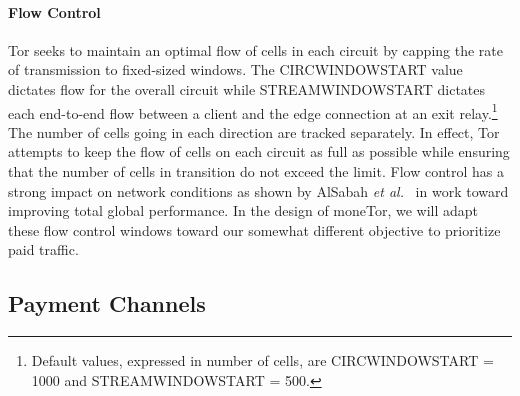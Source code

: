 \paragraph*{Flow Control} Tor seeks to maintain an optimal flow of cells in
each circuit by capping the rate of transmission to fixed-sized windows. The
CIRCWINDOWSTART value dictates flow for the overall circuit while
STREAMWINDOWSTART dictates each end-to-end flow between a client and the edge
connection at an exit relay.\footnote{Default values, expressed in number of
  cells, are CIRCWINDOWSTART = 1000 and STREAMWINDOWSTART = 500.} The number of
cells going in each direction are tracked separately. In effect, Tor attempts to
keep the flow of cells on each circuit as full as possible while ensuring that
the number of cells in transition do not exceed the limit. Flow control has a
strong impact on network conditions as shown by AlSabah \textit{et
  al.}~\cite{pets2011-defenestrator} in work toward improving total global
performance.  In the design of moneTor, we will adapt these flow control windows
toward our somewhat different objective to prioritize paid traffic.

\subsection{Payment Channels}

%

